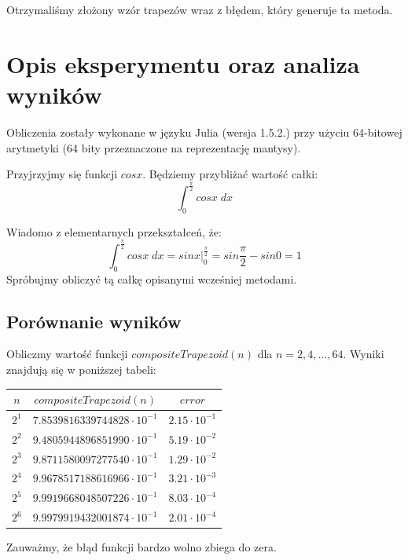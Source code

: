 \documentclass[12p]{article}
\begin{document}
Otrzymaliśmy złożony wzór trapezów wraz z błędem, który generuje ta metoda.

\section{Opis eksperymentu oraz analiza wyników}

Obliczenia zostały wykonane w języku Julia (wersja 1.5.2.)
przy użyciu 64-bitowej arytmetyki (64 bity przeznaczone na reprezentację mantysy).

Przyjrzyjmy się funkcji $cosx$. Będziemy przybliżać wartość całki:
\[ \int_{0}^{\frac{\pi}{2}} cosx\;dx\]

Wiadomo z elementarnych przekształceń, że:
\[  \int_{0}^{\frac{\pi}{2}} cosx\;dx = sinx |_{0}^{\frac{\pi}{2}} = sin\frac{\pi}{2} - sin0 = 1\]
Spróbujmy obliczyć tą całkę opisanymi wcześniej metodami.
\subsection{Porównanie wyników}

Obliczmy wartość funkcji $compositeTrapezoid(n)$ dla $n = 2,4,...,64$.
Wyniki znajdują się w poniższej tabeli:

\begin{table}[h]
\centering
\begin{tabular}{|c|c|c|}
    \hline
\large $n$   & $compositeTrapezoid(n)$   & $error$
    \normalsize\\
    \hline
    $2^1$      & $7.8539816339744828\cdot10^{-1}$ & $2.15\cdot10^{-1}$\\ \hline
    $2^2$      &   $9.4805944896851990\cdot10^{-1}$ & $5.19\cdot10^{-2}$\\ \hline
    $2^3$      &  $9.8711580097277540\cdot10^{-1}$& $ 1.29\cdot10^{-2}$\\ \hline
    $2^4$      &  $9.9678517188616966\cdot 10^{-1}$ & $3.21\cdot 10^{-3}$\\ \hline
    $2^5$      &  $9.9919668048507226\cdot 10^{-1}$&$8.03\cdot 10^{-4}$ \\ \hline
    $2^6$      &  $9.9979919432001874\cdot 10^{-1}$&$2.01\cdot 10^{-4}$ \\ \hline


\end{tabular}
\end{table}

Zauważmy, że błąd funkcji bardzo wolno zbiega do zera.\newpage
\end{document}
